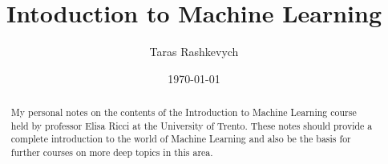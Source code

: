 \documentclass[12pt, letterpaper, twoside]{article}
\title{Intoduction to Machine Learning}
\author{Taras Rashkevych}
\date{\today}
\begin{document}
\begin{titlepage}
\maketitle
\end{titlepage}

\begin{abstract}
My personal notes on the contents of the 
Introduction to Machine Learning course held
by professor Elisa Ricci at the University of Trento.
These notes should provide a complete introduction
to the world of Machine Learning and also be the basis
for further courses on more deep topics in this area.
\end{abstract}
\end{document}
